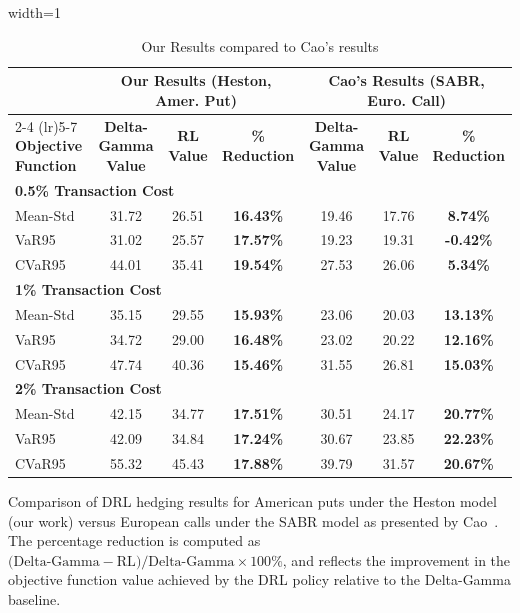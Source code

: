 \documentclass[a4paper,fleqn]{cas-dc}
\begin{document}
\begin{table}[pos=t]
\caption{Our Results compared to Cao's \cite{DH_1} results}
\begin{adjustbox}{width=1\textwidth}
\begin{tabular}{lcccccc}
\toprule
 & \multicolumn{3}{c}{\textbf{Our Results (Heston, Amer. Put)}} 
 & \multicolumn{3}{c}{\textbf{Cao's Results (SABR, Euro. Call)}} \\
\cmidrule(lr){2-4} \cmidrule(lr){5-7}
\textbf{Objective Function} 
 & \textbf{Delta-Gamma Value} 
 & \textbf{RL Value} 
 & \textbf{\% Reduction} 
 & \textbf{Delta-Gamma Value} 
 & \textbf{RL Value} 
 & \textbf{\% Reduction} \\
\midrule
\multicolumn{7}{l}{\textbf{0.5\% Transaction Cost}} \\
\midrule
Mean-Std & 31.72 & 26.51 & \textbf{16.43\%} & 19.46 & 17.76 & \textbf{8.74\%} \\
VaR95    & 31.02 & 25.57 & \textbf{17.57\%} & 19.23 & 19.31 & \textbf{-0.42\%} \\
CVaR95   & 44.01 & 35.41 & \textbf{19.54\%} & 27.53 & 26.06 & \textbf{5.34\%} \\
\midrule
\multicolumn{7}{l}{\textbf{1\% Transaction Cost}} \\
\midrule
Mean-Std & 35.15 & 29.55 & \textbf{15.93\%} & 23.06 & 20.03 & \textbf{13.13\%} \\
VaR95    & 34.72 & 29.00 & \textbf{16.48\%} & 23.02 & 20.22 & \textbf{12.16\%} \\
CVaR95   & 47.74 & 40.36 & \textbf{15.46\%} & 31.55 & 26.81 & \textbf{15.03\%} \\
\midrule
\multicolumn{7}{l}{\textbf{2\% Transaction Cost}} \\
\midrule
Mean-Std & 42.15 & 34.77 & \textbf{17.51\%} & 30.51 & 24.17 & \textbf{20.77\%} \\
VaR95    & 42.09 & 34.84 & \textbf{17.24\%} & 30.67 & 23.85 & \textbf{22.23\%} \\
CVaR95\footnotemark[3]   & 55.32 & 45.43 & \textbf{17.88\%} & 39.79 & 31.57 & \textbf{20.67\%} \\
\bottomrule
\end{tabular}
\end{adjustbox}
\justifying \small
Comparison of DRL hedging results for American puts under the Heston model (our work) versus European calls under the SABR model as presented by Cao~\cite{DH_1}. The percentage reduction is computed as $\bigl(\text{Delta-Gamma} - \text{RL}\bigr)/\text{Delta-Gamma} \times 100\%$, and reflects the improvement in the objective function value achieved by the DRL policy relative to the Delta-Gamma baseline.
\label{tab:resultsComparisonWithCao}
\end{table}
\end{document}
